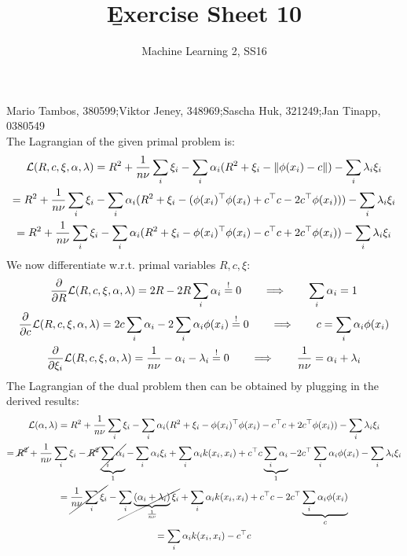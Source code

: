 \documentclass[a4paper]{article}
\newcommand{\norm}[1]{\left\lVert#1\right\rVert}
\newcommand{\eqq}{  \overset{\text{!}}{=} }
\newcommand{\1}{\mathds{1}}
\newcommand{\lag}{\mathcal{L}}
\begin{document}
\title{\b{Exercise Sheet 10}}
\author{Machine Learning 2, SS16}

\maketitle

Mario Tambos, 380599;\quad Viktor Jeney, 348969;\quad Sascha Huk, 321249;\quad Jan Tinapp, 0380549\\

The Lagrangian of the given primal problem is: 
\begin{gather*}
	\lag(R,c,\xi,\alpha,\lambda) = R^2 + {1\over n \nu}\sum_i \xi_i
	- \sum_i \alpha_i ( R^2 + \xi_i - \norm{\phi(x_i)-c}  )
	- \sum_i \lambda_i \xi_i
	\\
	=
	R^2 + {1\over n\nu}\sum_i \xi_i
	- \sum_i \alpha_i ( R^2 + \xi_i - (\phi(x_i)^\top\phi(x_i) + c^\top c - 2c^\top\phi(x_i))  )
	- \sum_i \lambda_i \xi_i
	\\
	=
	R^2 + {1\over n\nu}\sum_i \xi_i
	- \sum_i \alpha_i ( R^2 + \xi_i - \phi(x_i)^\top\phi(x_i) - c^\top c + 2c^\top\phi(x_i) )
	- \sum_i \lambda_i \xi_i	
\end{gather*}
We now differentiate w.r.t. primal variables $R,c,\xi$: 
\begin{gather*}
	{\partial\over\partial R}\lag(R,c,\xi,\alpha,\lambda) 
	=
	2R-2R\sum_i\alpha_i \eqq 0 
	\quad\quad\Longrightarrow\quad\quad
	\sum_i \alpha_i = 1
	\\
	{\partial\over\partial c}\lag(R,c,\xi,\alpha,\lambda) 
	=
	2c\sum_i\alpha_i - 2\sum_i\alpha_i\phi(x_i) \eqq 0
	\quad\quad\Longrightarrow\quad\quad
	c = \sum_i\alpha_i\phi(x_i) 
	\\
	{\partial\over\partial \xi_i}\lag(R,c,\xi,\alpha,\lambda) 
	=
	{1\over n\nu} - \alpha_i - \lambda_i \eqq 0
	\quad\quad\Longrightarrow\quad\quad
	{1\over n\nu} = \alpha_i + \lambda_i
\end{gather*}
The Lagrangian of the dual problem then can be obtained by plugging in the derived results: 
\begin{gather*}
	\lag(\alpha, \lambda )
	=
	R^2 + {1\over n\nu}\sum_i \xi_i
	- \sum_i \alpha_i ( R^2 + \xi_i - \phi(x_i)^\top\phi(x_i) - c^\top c + 2c^\top\phi(x_i) )
	- \sum_i \lambda_i \xi_i
	\\
	=
	\cancel{R^2} + {1\over n\nu}\sum_i \xi_i
	- \cancel{R^2} \underbrace{\cancel{\sum_i \alpha_i}}_{1}
	- \sum_i \alpha_i \xi_i
	+ \sum_i \alpha_i k(x_i,x_i)
	+ c^\top c \underbrace{\sum_i \alpha_i}_{1} 
	- 2c^\top \sum_i \alpha_i \phi(x_i)
	- \sum_i \lambda_i \xi_i
	\\
	=
	\cancel{{1\over n\nu}\sum_i \xi_i}
	- \cancel{\sum_i \underbrace{(\alpha_i + \lambda_i)}_{1\over n\nu} \xi_i}
	+ \sum_i \alpha_i k(x_i,x_i)
	+ c^\top c 
	- 2c^\top\underbrace{\sum_i \alpha_i \phi(x_i)}_{c}
	\\
	=
	\sum_i \alpha_i k(x_i,x_i)
	- c^\top c 
\end{gather*}
\end{document}
